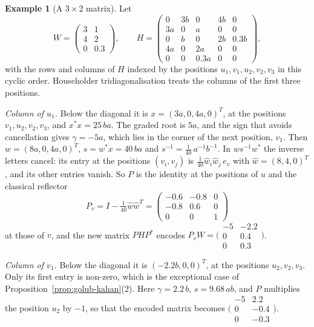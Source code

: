 \documentclass[12pt, a4paper]{report}
\theoremstyle{plain}
\theoremstyle{definition}
\newtheorem{example}[theorem]{Example}
\theoremstyle{remark}
\theoremstyle{plain}
\begin{document}
\begin{example}[A $3\times2$ matrix]\label{ex:golub-kahan-numbers}
Let
\[ W=\begin{pmatrix}3&1\\4&2\\0&0.3\end{pmatrix},\qquad H=\begin{pmatrix}0&3b&0&4b&0\\3a&0&a&0&0\\0&b&0&2b&0.3b\\4a&0&2a&0&0\\0&0&0.3a&0&0\end{pmatrix}, \]
with the rows and columns of $H$ indexed by the positions $u_1,v_1,u_2,v_2,v_3$ in this cyclic order. Householder tridiagonalisation treats the columns of the first three positions.

\emph{Column of $u_1$.} Below the diagonal it is $x=(3a,0,4a,0)^T$, at the positions $v_1,u_2,v_2,v_3$, and $x^*x=25\,ba$. The graded root is $5a$, and the sign that avoids cancellation gives $\gamma=-5a$, which lies in the corner of the next position, $v_1$. Then $w=(8a,0,4a,0)^T$, $s=w^*x=40\,ba$ and $s^{-1}=\tfrac1{40}\,a^{-1}b^{-1}$. In $ws^{-1}w^*$ the inverse letters cancel: its entry at the positions $(v_i,v_j)$ is $\tfrac1{40}\hat w_i\hat w_j\,e_v$ with $\hat w=(8,4,0)^T$, and its other entries vanish. So $P$ is the identity at the positions of $u$ and the classical reflector
\[ P_v=I-\tfrac1{40}\hat w\hat w^T=\begin{pmatrix}-0.6&-0.8&0\\-0.8&0.6&0\\0&0&1\end{pmatrix} \]
at those of $v$, and the new matrix $PHP^*$ encodes $P_vW=\bigl(\begin{smallmatrix}-5&-2.2\\0&0.4\\0&0.3\end{smallmatrix}\bigr)$.

\emph{Column of $v_1$.} Below the diagonal it is $(-2.2b,0,0)^T$, at the positions $u_2,v_2,v_3$. Only its first entry is non-zero, which is the exceptional case of Proposition~\ref{prop:golub-kahan}(2). Here $\gamma=2.2\,b$, $s=9.68\,ab$, and $P$ multiplies the position $u_2$ by $-1$, so that the encoded matrix becomes $\bigl(\begin{smallmatrix}-5&2.2\\0&-0.4\\0&-0.3\end{smallmatrix}\bigr)$.


\end{example}
\end{document}
